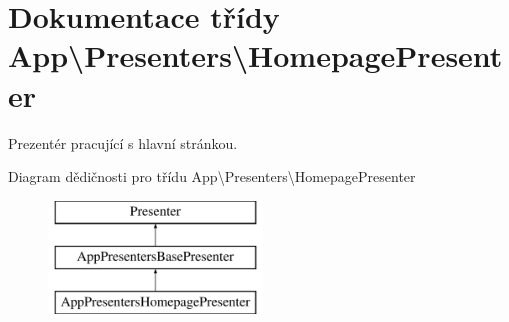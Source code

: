 \hypertarget{classApp_1_1Presenters_1_1HomepagePresenter}{\section{Dokumentace třídy App\textbackslash{}Presenters\textbackslash{}Homepage\-Presenter}
\label{classApp_1_1Presenters_1_1HomepagePresenter}
}


Prezentér pracující s hlavní stránkou.  


Diagram dědičnosti pro třídu App\textbackslash{}Presenters\textbackslash{}Homepage\-Presenter\begin{figure}[H]
\begin{center}
\leavevmode
\includegraphics[height=3.000000cm]{classApp_1_1Presenters_1_1HomepagePresenter}
\end{center}
\end{figure}
